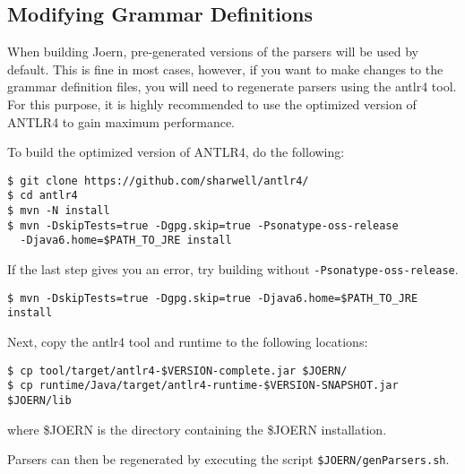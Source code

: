 \documentclass[a4paper]{article}
\newcommand{\code}[1]{\texttt{\small #1}}
\begin{document}
\subsection{Modifying Grammar Definitions}

When building Joern, pre-generated versions of the parsers will be
used by default. This is fine in most cases, however, if you want to
make changes to the grammar definition files, you will need to
regenerate parsers using the antlr4 tool. For this purpose, it is
highly recommended to use the optimized version of ANTLR4 to gain
maximum performance.

To build the optimized version of ANTLR4, do the following:
\begin{verbatim}
$ git clone https://github.com/sharwell/antlr4/
$ cd antlr4
$ mvn -N install
$ mvn -DskipTests=true -Dgpg.skip=true -Psonatype-oss-release
  -Djava6.home=$PATH_TO_JRE install
\end{verbatim}

If the last step gives you an error, try building without
\code{-Psonatype-oss-release}.

\begin{verbatim}
$ mvn -DskipTests=true -Dgpg.skip=true -Djava6.home=$PATH_TO_JRE install
\end{verbatim}

Next, copy the antlr4 tool and runtime to the following locations:

\begin{verbatim}
$ cp tool/target/antlr4-$VERSION-complete.jar $JOERN/
$ cp runtime/Java/target/antlr4-runtime-$VERSION-SNAPSHOT.jar $JOERN/lib
\end{verbatim}

where \$JOERN is the directory containing the \$JOERN installation.

Parsers can then be regenerated by executing the script
\code{\$JOERN/genParsers.sh}.




\end{document}
